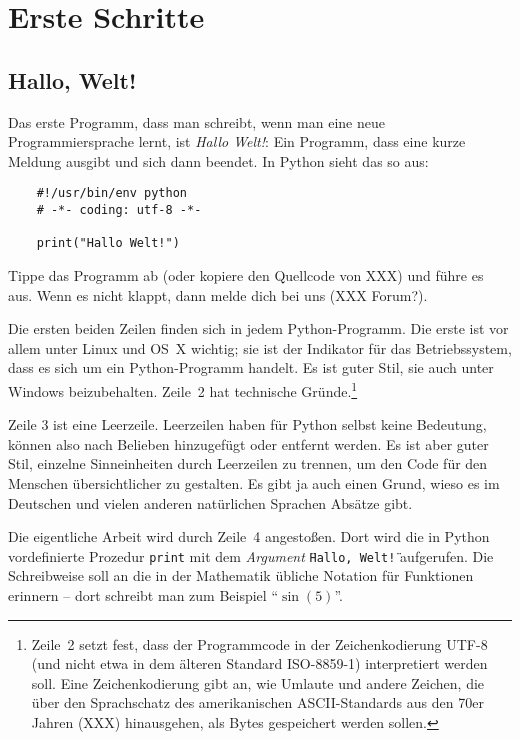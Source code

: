 \documentclass{blatt}
\begin{document}
\section{Erste Schritte}

\subsection{Hallo, Welt!}

Das erste Programm, dass man schreibt, wenn man eine neue Programmiersprache
lernt, ist \emph{Hallo Welt!}: Ein Programm, dass eine kurze Meldung ausgibt
und sich dann beendet. In Python sieht das so aus:

\begin{verbatim}
    #!/usr/bin/env python
    # -*- coding: utf-8 -*-

    print("Hallo Welt!")
\end{verbatim}

Tippe das Programm ab (oder kopiere den Quellcode von XXX) und führe es aus.
Wenn es nicht klappt, dann melde dich bei uns (XXX Forum?).

Die ersten beiden Zeilen finden sich in jedem Python-Programm. Die erste ist
vor allem unter Linux und OS~X wichtig; sie ist der Indikator für das
Betriebssystem, dass es sich um ein Python-Programm handelt. Es ist guter Stil,
sie auch unter Windows beizubehalten. Zeile~2 hat technische
Gründe.\footnote{Zeile~2 setzt fest, dass der Programmcode in der
Zeichenkodierung UTF-8 (und nicht etwa in dem älteren Standard ISO-8859-1)
interpretiert werden soll. Eine Zeichenkodierung gibt an, wie Umlaute und
andere Zeichen, die über den Sprachschatz des amerikanischen ASCII-Standards
aus den 70er Jahren (XXX) hinausgehen, als Bytes gespeichert werden sollen.}

Zeile 3 ist eine Leerzeile. Leerzeilen haben für Python selbst keine Bedeutung,
können also nach Belieben hinzugefügt oder entfernt werden. Es ist aber guter
Stil, einzelne Sinneinheiten durch Leerzeilen zu trennen, um den Code für den
Menschen übersichtlicher zu gestalten. Es gibt ja auch einen Grund, wieso es im
Deutschen und vielen anderen natürlichen Sprachen Absätze gibt.

Die eigentliche Arbeit wird durch Zeile~4 angestoßen. Dort wird die in Python
vordefinierte Prozedur \texttt{print} mit dem \emph{Argument} \texttt{\"{}Hallo,
Welt!\"} aufgerufen. Die Schreibweise soll an die in der Mathematik übliche
Notation für Funktionen erinnern -- dort schreibt man zum Beispiel
"`$\sin(5)$"'.
\end{document}
